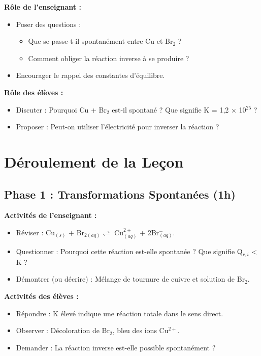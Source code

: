 \documentclass[12pt]{article}
\begin{document}
\textbf{Rôle de l’enseignant :}
\begin{itemize}
    \item Poser des questions : 
    \begin{itemize}
        \item  Que se passe-t-il spontanément entre Cu et Br\(_{2}\) ? 
        \item  Comment obliger la réaction inverse à se produire ? 
    \end{itemize}
    \item Encourager le rappel des constantes d’équilibre.
\end{itemize}

\textbf{Rôle des élèves :}
\begin{itemize}
    \item Discuter : Pourquoi Cu + Br\(_{2}\) est-il spontané ? Que signifie K = 1,2 × 10\(^{25}\) ?
    \item Proposer : Peut-on utiliser l’électricité pour inverser la réaction ?
\end{itemize}

\section{Déroulement de la Leçon}

\subsection{Phase 1 : Transformations Spontanées (1h)}
\textbf{Activités de l’enseignant :}
\begin{itemize}
    \item Réviser : Cu\(_{(s)}\) + Br\(_{2(aq)} \rightleftharpoons\) Cu\(^{2+}_{(aq)}\) + 2Br\(^-_{(aq)}\).
    \item Questionner : Pourquoi cette réaction est-elle spontanée ? Que signifie Q\(_{r,i}\) < K ? 
    \item Démontrer (ou décrire) : Mélange de tournure de cuivre et solution de Br\(_{2}\).
\end{itemize}

\textbf{Activités des élèves :}
\begin{itemize}
    \item Répondre :  K élevé indique une réaction totale dans le sens direct. 
    \item Observer : Décoloration de Br\(_{2}\), bleu des ions Cu\(^{2+}\).
    \item Demander : La réaction inverse est-elle possible spontanément ? 
\end{itemize}
\end{document}
